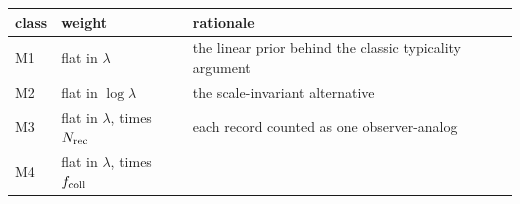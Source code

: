 \begin{longtable}[]{@{}lll@{}}
\toprule
\begin{minipage}[b]{0.07\columnwidth}\raggedright
class\strut
\end{minipage} & \begin{minipage}[b]{0.22\columnwidth}\raggedright
weight\strut
\end{minipage} & \begin{minipage}[b]{0.62\columnwidth}\raggedright
rationale\strut
\end{minipage}\tabularnewline
\midrule
\endhead
\begin{minipage}[t]{0.07\columnwidth}\raggedright
M1\strut
\end{minipage} & \begin{minipage}[t]{0.22\columnwidth}\raggedright
flat in \(\lambda\)\strut
\end{minipage} & \begin{minipage}[t]{0.62\columnwidth}\raggedright
the linear prior behind the classic typicality argument\strut
\end{minipage}\tabularnewline
\begin{minipage}[t]{0.07\columnwidth}\raggedright
M2\strut
\end{minipage} & \begin{minipage}[t]{0.22\columnwidth}\raggedright
flat in \(\log\lambda\)\strut
\end{minipage} & \begin{minipage}[t]{0.62\columnwidth}\raggedright
the scale-invariant alternative\strut
\end{minipage}\tabularnewline
\begin{minipage}[t]{0.07\columnwidth}\raggedright
M3\strut
\end{minipage} & \begin{minipage}[t]{0.22\columnwidth}\raggedright
flat in \(\lambda\), times \(N_{\rm rec}\)\strut
\end{minipage} & \begin{minipage}[t]{0.62\columnwidth}\raggedright
each record counted as one observer-analog\strut
\end{minipage}\tabularnewline
\begin{minipage}[t]{0.07\columnwidth}\raggedright
M4\strut
\end{minipage} & \begin{minipage}[t]{0.22\columnwidth}\raggedright
flat in \(\lambda\), times \(f_{\rm coll}\)\strut
\end{minipage} & \begin{minipage}[t]{0.62\columnwidth}\raggedright

\end{minipage}
\end{longtable}
